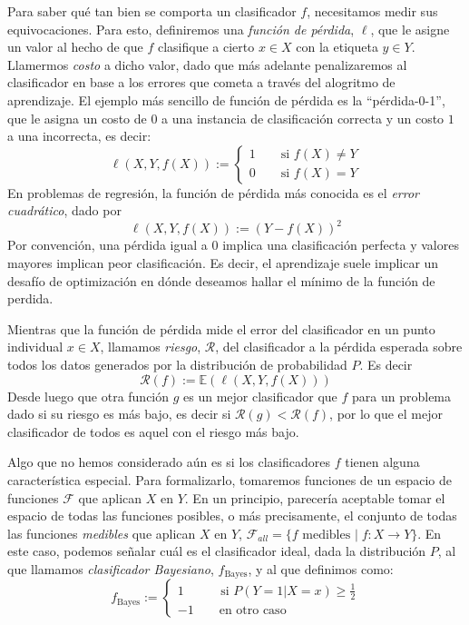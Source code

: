 \documentclass{report}
\begin{document}
Para saber qué tan bien se comporta un clasificador $f$, necesitamos medir sus equivocaciones. Para esto, definiremos una \textit{función de pérdida},
$\ell$, que le asigne un valor al hecho de que $f$ clasifique a cierto $x\in X$ con la etiqueta $y\in Y$. Llamermos \textit{costo} a dicho valor, 
dado que más adelante penalizaremos al clasificador en base a los errores que cometa a través del alogritmo de aprendizaje.\newline
El ejemplo más sencillo de función de pérdida es la ``pérdida-0-1'', que le asigna un costo de $0$ a una instancia de clasificación correcta y un costo
$1$ a una incorrecta, es decir:
\[
\ell(X,Y,f(X)):= \begin{cases}
    1 \qquad \text{si } f(X) \neq Y \\
    0 \qquad \text{si } f(X) = Y
\end{cases}
\]
En problemas de regresión, la función de pérdida más conocida es el \textit{error cuadrático}, dado por
\[
\ell(X,Y,f(X)):= (Y-f(X))^2
\]
Por convención, una pérdida igual a $0$ implica una clasificación perfecta y valores mayores implican peor clasificación. Es decir,
el aprendizaje suele implicar un desafío de optimización en dónde deseamos hallar el mínimo de la función de perdida.

Mientras que la función de pérdida mide el error del clasificador en un punto individual $x\in X$, llamamos \textit{riesgo}, $\mathcal{R}$, 
del clasificador a la pérdida esperada sobre todos los datos generados por la distribución de probabilidad $P$. Es decir
\[
\mathcal{R}(f) := \mathbb{E}\left( \ell(X,Y,f(X)) \right)
\]
Desde luego que otra función $g$ es un mejor clasificador que $f$ para un problema dado si su riesgo es más bajo, es decir si $\mathcal{R}(g)
< \mathcal{R}(f)$, por lo que el mejor clasificador de todos es aquel con el riesgo más bajo.

Algo que no hemos considerado aún es si los clasificadores $f$ tienen alguna característica especial. Para formalizarlo, tomaremos funciones de un
espacio de funciones $\mathcal{F}$ que aplican $X$ en $Y$. En un principio, parecería aceptable tomar el espacio de todas las funciones posibles, o 
más precisamente, el conjunto de todas las funciones \textit{medibles} que aplican $X$ en $Y$, $\mathcal{F}_{all} = \{f \text{ medibles  } | 
\; f: X \rightarrow Y \}$. En este caso, podemos señalar cuál es el clasificador ideal, dada la distribución $P$, al que llamamos
\textit{clasificador Bayesiano}, $f_{\text{Bayes}}$, y al que definimos como:
\[
f_{\text{Bayes}} := \begin{cases}
1 \qquad \; \; \text{  si } P(Y=1 | X=x) \geq \frac{1}{2}\\
-1 \qquad \text{en otro caso }
\end{cases}
\]
\end{document}
